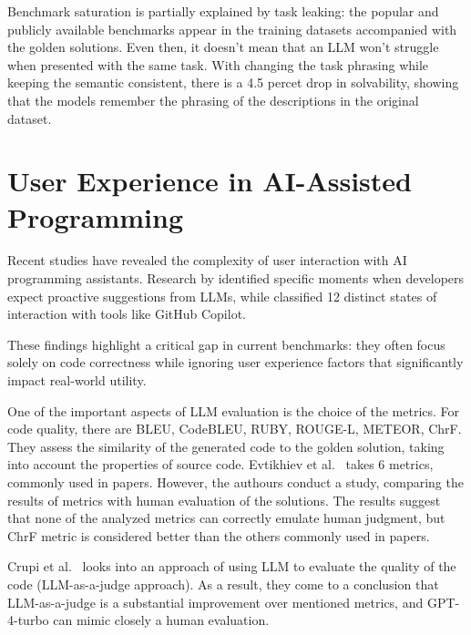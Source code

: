Benchmark saturation is partially explained by task leaking: the popular and publicly available benchmarks appear in the training datasets accompanied with the golden solutions. Even then, it doesn't mean that an LLM won't struggle when presented with the same task. With changing the task phrasing while keeping the semantic consistent, there is a 4.5 percet drop in solvability, showing that the models remember the phrasing of the descriptions in the original dataset. \cite{uniyal2024one}


\section{User Experience in AI-Assisted Programming}

Recent studies have revealed the complexity of user interaction with AI programming assistants. Research by \cite{chen2025needhelpdesigningproactive} identified specific moments when developers expect proactive suggestions from LLMs, while \cite{mozannar2024readinglinesmodelinguser} classified 12 distinct states of interaction with tools like GitHub Copilot.

These findings highlight a critical gap in current benchmarks: they often focus solely on code correctness while ignoring user experience factors that significantly impact real-world utility.

One of the important aspects of LLM evaluation is the choice of the metrics.
For code quality, there are BLEU, CodeBLEU, RUBY, ROUGE-L, METEOR, ChrF\@.
They assess the similarity of the generated code to the golden solution, taking into account the properties of source code.
Evtikhiev et al.~\cite{evtikhiev2023out} takes 6 metrics, commonly used in papers.
However, the authours conduct a study, comparing the results of metrics with human evaluation of the solutions.
The results suggest that none of the analyzed metrics can correctly emulate human judgment, but ChrF metric is considered better than the others commonly used in papers.

Crupi et al.~\cite{crupi2025effectiveness} looks into an approach of using LLM to evaluate the quality of the code (LLM-as-a-judge approach).
As a result, they come to a conclusion that LLM-as-a-judge is a substantial improvement over mentioned metrics, and GPT-4-turbo can mimic closely a human evaluation.

